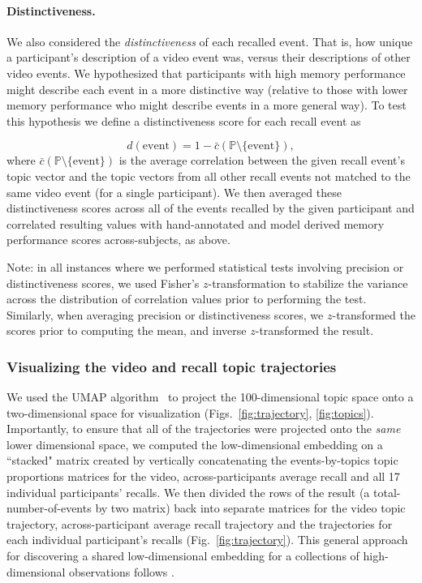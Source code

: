 \documentclass{article}
\begin{document}
\paragraph*{Distinctiveness.}
We also considered the \textit{distinctiveness} of each recalled event. That is, how unique a participant's description of a video event was, versus their descriptions of other video events.  We hypothesized that participants with high memory performance might describe each event in a more distinctive way (relative to those with lower memory performance who might describe events in a more general way).  To test this hypothesis we define a distinctiveness score for each recall event as

\[
  d(\mathrm{event}) = 1 - \bar{c}(\mathrm{\mathbb{P} \setminus \{event\}}),
\]
where $\bar{c}(\mathrm{\mathbb{P} \setminus \{event\}})$ is the average correlation between the given recall event's topic vector and the topic vectors from all other recall events not matched to the same video event (for a single participant).  We then averaged these distinctiveness scores across all of the events recalled by the given participant and correlated resulting values with hand-annotated and model derived memory performance scores across-subjects, as above.

\noindent Note: in all instances where we performed statistical tests involving precision or distinctiveness scores, we used Fisher's $z$-transformation \citep{Fish25} to stabilize the variance across the distribution of correlation values prior to performing the test.  Similarly, when averaging precision or distinctiveness scores, we $z$-transformed the scores prior to computing the mean, and inverse $z$-transformed the result.

\subsubsection*{Visualizing the video and recall topic trajectories}
We used the UMAP algorithm~\citep{McInEtal18} to project the 100-dimensional topic space onto a two-dimensional space for visualization (Figs.~\ref{fig:trajectory}, \ref{fig:topics}).  Importantly, to ensure that all of the trajectories were projected onto the \textit{same} lower dimensional space, we computed the low-dimensional embedding on a ``stacked" matrix created by vertically concatenating the events-by-topics topic proportions matrices for the video, across-participants average recall and all 17 individual participants' recalls.  We then divided the rows of the result (a total-number-of-events by two matrix) back into separate matrices for the video topic trajectory, across-participant average recall trajectory and the trajectories for each individual participant's recalls (Fig.~\ref{fig:trajectory}).  This general approach for discovering a shared low-dimensional embedding for a collections of high-dimensional observations follows \cite{HeusEtal18a}.
\end{document}
